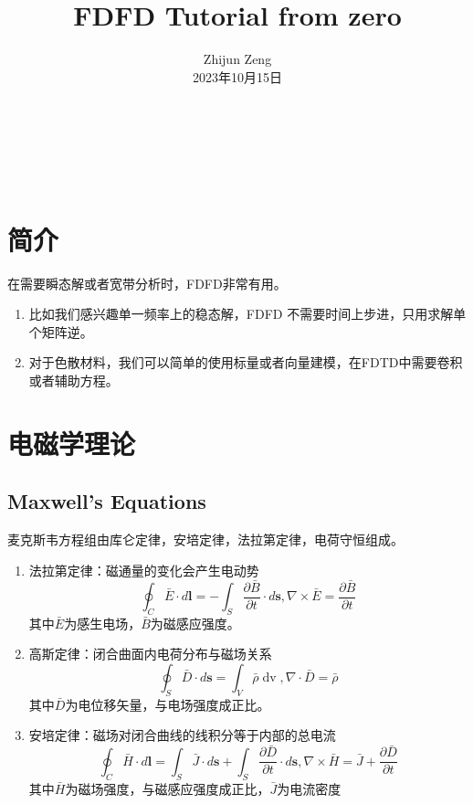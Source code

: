 \documentclass{article}
\newcommand{\tmaffiliation}[1]{\\ #1}
\newcommand{\tmmathbf}[1]{\ensuremath{\boldsymbol{#1}}}
\newcommand{\tmop}[1]{\ensuremath{\operatorname{#1}}}
\begin{document}
\begin{CJK*}{UTF8}{gbsn}

\title{FDFD Tutorial from zero}

\author{
  Zhijun Zeng
  \tmaffiliation{2023年10月15日}
}

\maketitle

\

\

\section{简介}

在需要瞬态解或者宽带分析时，FDFD非常有用。
\begin{enumerate}
  \item 比如我们感兴趣单一频率上的稳态解，FDFD
  不需要时间上步进，只用求解单个矩阵逆。
  
  \item
  对于色散材料，我们可以简单的使用标量或者向量建模，在FDTD中需要卷积或者辅助方程。
\end{enumerate}

\section{电磁学理论}

\subsection{Maxwell's Equations}

麦克斯韦方程组由库仑定律，安培定律，法拉第定律，电荷守恒组成。
\begin{enumerate}
  \item 法拉第定律：磁通量的变化会产生电动势
  \[ \oint_C \bar{E} \cdot d\tmmathbf{l}= - \int_S \frac{\partial
     \bar{B}}{\partial t} \cdot d\tmmathbf{s}, \nabla \times \bar{E} =
     \frac{\partial \bar{B}}{\partial t} \]
  其中$\bar{E}$为感生电场，$\bar{B}$为磁感应强度。
  
  \item 高斯定律：闭合曲面内电荷分布与磁场关系
  \[ \oint_S \bar{D} \cdot d\tmmathbf{s}= \int_V \bar{\rho} \tmop{dv}, \nabla
     \cdot \bar{D} = \bar{\rho} \]
  其中$\bar{D}$为电位移矢量，与电场强度成正比。
  
  \item
  安培定律：磁场对闭合曲线的线积分等于内部的总电流
  \[ \oint_C \bar{H} \cdot d\tmmathbf{l}= \int_S \bar{J} \cdot d\tmmathbf{s}+
     \int_S \frac{\partial \bar{D}}{\partial t} \cdot d\tmmathbf{s}, \nabla
     \times \bar{H} = \bar{J} + \frac{\partial \bar{D}}{\partial t} \]
  其中$\bar{H}$为磁场强度，与磁感应强度成正比，$\bar{J}$为电流密度
  

\end{enumerate}
\end{CJK*}
\end{document}
